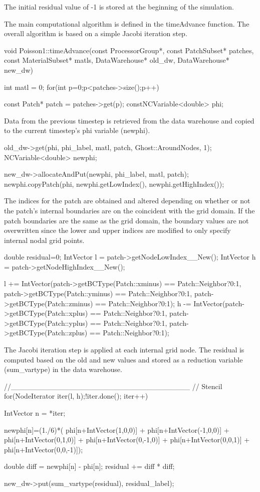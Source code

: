 \documentclass[12pt]{report}
\begin{document}
The initial residual value of -1 is stored at the beginning of the simulation.

The main computational algorithm is defined in the timeAdvance function.  The overall algorithm is based on a simple Jacobi iteration step.  

void Poisson1::timeAdvance(const ProcessorGroup*,
                           const PatchSubset* patches,
                           const MaterialSubset* matls,
                           DataWarehouse* old_dw,
                           DataWarehouse* new_dw)
{
  int matl = 0;
  for(int p=0;p<patches->size();p++){
    const Patch* patch = patches->get(p);
    constNCVariable<double> phi;

Data from the previous timestep is retrieved from the data warehouse and copied to the current timestep's phi variable (newphi).

    old_dw->get(phi, phi_label, matl, patch, Ghost::AroundNodes, 1);
    NCVariable<double> newphi;

    new_dw->allocateAndPut(newphi, phi_label, matl, patch);
    newphi.copyPatch(phi, newphi.getLowIndex(), newphi.getHighIndex());

The indices for the patch are obtained and altered depending on whether or not the patch's internal boundaries are on the coincident with the grid domain.  If the patch boundaries are the same as the grid domain, the boundary values are not overwritten since the lower and upper indices are modified to only specify internal nodal grid points.

    double residual=0;
    IntVector l = patch->getNodeLowIndex__New();
    IntVector h = patch->getNodeHighIndex__New();

    l += IntVector(patch->getBCType(Patch::xminus) == Patch::Neighbor?0:1,
                   patch->getBCType(Patch::yminus) == Patch::Neighbor?0:1,
                   patch->getBCType(Patch::zminus) == Patch::Neighbor?0:1);
    h -= IntVector(patch->getBCType(Patch::xplus)  == Patch::Neighbor?0:1,
                   patch->getBCType(Patch::yplus)  == Patch::Neighbor?0:1,
                   patch->getBCType(Patch::zplus)  == Patch::Neighbor?0:1);

The Jacobi iteration step is applied at each internal grid node.  The residual is computed based on the old and new values and stored as a reduction variable (sum_vartype) in the data warehouse.


    //__________________________________
    //  Stencil
    for(NodeIterator iter(l, h);!iter.done(); iter++){
      IntVector n = *iter;

      newphi[n]=(1./6)*(
        phi[n+IntVector(1,0,0)] + phi[n+IntVector(-1,0,0)] +
        phi[n+IntVector(0,1,0)] + phi[n+IntVector(0,-1,0)] +
        phi[n+IntVector(0,0,1)] + phi[n+IntVector(0,0,-1)]);

      double diff = newphi[n] - phi[n];
      residual += diff * diff;
    }
    new_dw->put(sum_vartype(residual), residual_label);
  }
}
\end{document}
